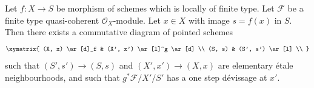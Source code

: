 \begin{lemma}
\label{lemma-elementary-devissage-variant}
Let $f : X \to S$ be morphism of schemes which is locally of finite type.
Let $\mathcal{F}$ be a finite type quasi-coherent $\mathcal{O}_X$-module.
Let $x \in X$ with image $s = f(x)$ in $S$.
Then there exists a commutative diagram of pointed schemes
$$
\xymatrix{
(X, x) \ar[d]_f & (X', x') \ar[l]^g \ar[d] \\
(S, s) & (S', s') \ar[l] \\
}
$$
such that $(S', s') \to (S, s)$ and $(X', x') \to (X, x)$
are elementary \'etale neighbourhoods, and such that
$g^*\mathcal{F}/X'/S'$ has a one step d\'evissage at $x'$.
\end{lemma}